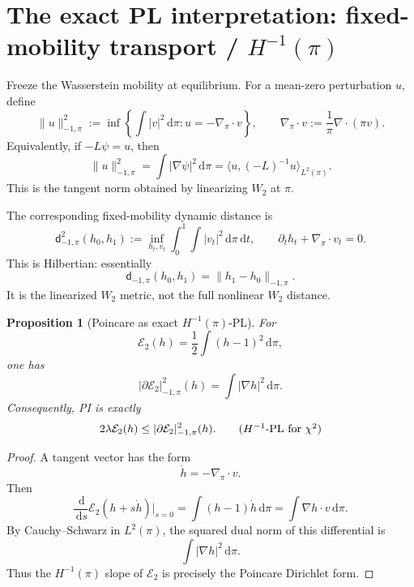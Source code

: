 \documentclass[11pt]{article}
\newtheorem{proposition}{Proposition}
\newcommand{\dd}{\,\mathrm d}
\newcommand{\E}{\mathcal E}
\newcommand{\nablapi}{\nabla_{\!\pi}\!\cdot}
\begin{document}
\section{The exact PL interpretation: fixed-mobility transport / $H^{-1}(\pi)$}

Freeze the Wasserstein mobility at equilibrium. For a mean-zero perturbation $u$, define
\begin{equation}
        \|u\|_{-1,\pi}^2
        :=
        \inf\left\{
        \int |v|^2\dd\pi:
        u=-\nablapi v
        \right\},
        \qquad
        \nablapi v:=\frac1\pi\nabla\cdot(\pi v).
\end{equation}
Equivalently, if $-L\psi=u$, then
\[
        \|u\|_{-1,\pi}^2
        =\int |\nabla\psi|^2\dd\pi
        =\langle u,(-L)^{-1}u\rangle_{L^2(\pi)}.
\]
This is the tangent norm obtained by linearizing $W_2$ at $\pi$.

The corresponding fixed-mobility dynamic distance is
\begin{equation}
        \mathsf d_{-1,\pi}^2(h_0,h_1)
        :=
        \inf_{h_t,v_t}
        \int_0^1\int |v_t|^2\dd\pi\dd t,
        \qquad
        \partial_t h_t+\nablapi v_t=0.
\end{equation}
This is Hilbertian: essentially
\[
        \mathsf d_{-1,\pi}(h_0,h_1)
        =\|h_1-h_0\|_{-1,\pi}.
\]
It is the linearized $W_2$ metric, not the full nonlinear $W_2$ distance.

\begin{proposition}[Poincare as exact $H^{-1}(\pi)$-PL]
For
\[
        \E_2(h)=\frac12\int (h-1)^2\dd\pi,
\]
one has
\begin{equation}
        |\partial \E_2|_{-1,\pi}^2(h)
        =\int |\nabla h|^2\dd\pi.
\end{equation}
Consequently, PI is exactly
\begin{equation}
        2\lambda \E_2(h)
        \le
        |\partial \E_2|_{-1,\pi}^2(h).
        \tag{$H^{-1}$-PL for $\chi^2$}
\end{equation}
\end{proposition}

\begin{proof}
A tangent vector has the form
\[
        \dot h=-\nablapi v.
\]
Then
\[
        \frac{\dd}{\dd s}\E_2(h+s\dot h)\bigg|_{s=0}
        =\int (h-1)\dot h\dd\pi
        =\int \nabla h\cdot v\dd\pi.
\]
By Cauchy--Schwarz in $L^2(\pi)$, the squared dual norm of this differential is
\[
        \int |\nabla h|^2\dd\pi.
\]
Thus the $H^{-1}(\pi)$ slope of $\E_2$ is precisely the Poincare Dirichlet form.
\end{proof}
\end{document}
